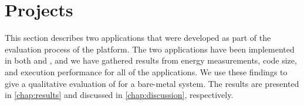 
\section{Projects}
\label{sec:impl:projects}

This section describes two applications that were developed as part of the evaluation process of the {\rg} platform.
The two applications have been implemented in both {\rust} and {\C}, and we have gathered results from energy measurements, code size, and execution performance for all of the applications.
We use these findings to give a qualitative evaluation of {\rust} for a bare-metal system.
The results are presented in \autoref{chap:results} and discussed in \autoref{chap:discussion}, respectively.



